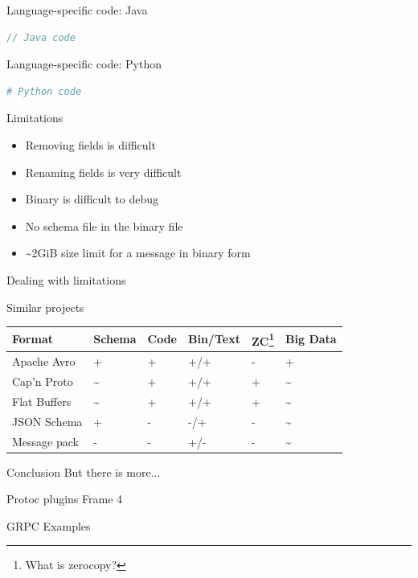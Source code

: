 \documentclass{beamer}
\begin{document}
\begin{frame}[fragile]{Language-specific code: Java}
\begin{lstlisting}[language=java,caption={Create and access proto message in Java}]
// Java code
\end{lstlisting}
\end{frame}

\begin{frame}[fragile]{Language-specific code: Python}
\begin{lstlisting}[language=python,caption={Create and access proto message in Python}]
# Python code
\end{lstlisting}
\end{frame}

\begin{frame}{Limitations}
\begin{itemize}[label=\Sey{}]
\item Removing fields is difficult
\item Renaming fields is very difficult
\item Binary is difficult to debug
\item No schema file in the binary file
\item \textasciitilde2GiB size limit for a message in binary form
\end{itemize}
\end{frame}

\begin{frame}{Dealing with limitations}

\end{frame}

\begin{frame}{Similar projects}
  \begin{center}
    \begin{tabular}{ l l l l l l }
      Format & Schema & Code & Bin/Text & ZC\footnote[1]{ What is zerocopy? }  & Big Data \\
      \hline
      Apache Avro & + & + & +/+ & - & + \\
      Cap'n Proto & \textasciitilde & + & +/+ & + & \textasciitilde \\
      Flat Buffers & \textasciitilde & + & +/+ & + & \textasciitilde \\
      JSON Schema & + & - & -/+ & - & \textasciitilde \\
      Message pack & - & - & +/- & - & \textasciitilde
    \end{tabular}
  \end{center}
\end{frame}

\begin{frame}{Conclusion}
But there is more...
\end{frame}

\begin{frame}{Protoc plugins}
Frame 4
\end{frame}

\begin{frame}{GRPC}
Examples
\end{frame}
\end{document}
